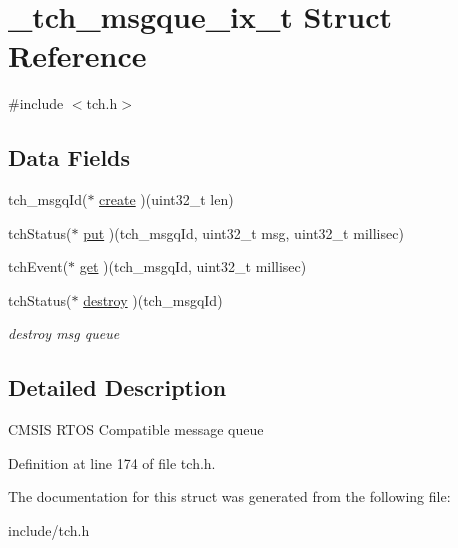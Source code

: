 \hypertarget{struct__tch__msgque__ix__t}{\section{\+\_\+tch\+\_\+msgque\+\_\+ix\+\_\+t Struct Reference}
\label{struct__tch__msgque__ix__t}
}


{\ttfamily \#include $<$tch.\+h$>$}

\subsection*{Data Fields}
\begin{DoxyCompactItemize}
\item 
tch\+\_\+msgq\+Id($\ast$ \hyperlink{group___a_p_i_gacd7fbe11975c8e0b1a93fe399aed2ee0}{create} )(uint32\+\_\+t len)
\item 
tch\+Status($\ast$ \hyperlink{group___a_p_i_ga995b80b91503a51429073f1c7b18baba}{put} )(tch\+\_\+msgq\+Id, uint32\+\_\+t msg, uint32\+\_\+t millisec)
\item 
tch\+Event($\ast$ \hyperlink{group___a_p_i_gae5f29b1432e00abd819c419e351f6f0b}{get} )(tch\+\_\+msgq\+Id, uint32\+\_\+t millisec)
\item 
\hypertarget{group___a_p_i_gad72012110f051f2e783b3f7fd01178ad}{tch\+Status($\ast$ \hyperlink{group___a_p_i_gad72012110f051f2e783b3f7fd01178ad}{destroy} )(tch\+\_\+msgq\+Id)}\label{group___a_p_i_gad72012110f051f2e783b3f7fd01178ad}

\begin{DoxyCompactList}\small\item\em destroy msg queue \end{DoxyCompactList}\end{DoxyCompactItemize}


\subsection{Detailed Description}
C\+M\+S\+I\+S R\+T\+O\+S Compatible message queue 

Definition at line 174 of file tch.\+h.



The documentation for this struct was generated from the following file\+:\begin{DoxyCompactItemize}
\item 
include/tch.\+h\end{DoxyCompactItemize}
